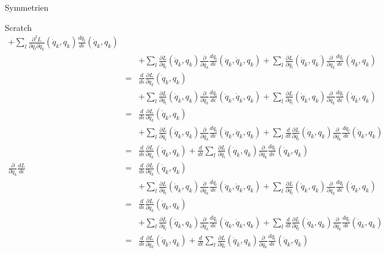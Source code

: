 \documentclass[a4paper,fleqn]{article}
\numberwithin{equation}{section}
\begin{document}
\begin{section}{Symmetrien}
\begin{subsection}{Scratch}
\begin{eqnarray*}
+\sum_l\frac{\partial^2 L}{\partial q_l\partial q_k}(\dot{q}_k,q_k)\frac{dq_l}{d\epsilon}(\dot{q}_k,q_k)\\
&&+\sum_l\frac{\partial L}{\partial \dot{q}_l}(\dot{q}_k,q_k)\frac{\partial}{\partial q_k}\frac{d\dot{q}_l}{d\epsilon}(\ddot{q}_k,\dot{q}_k,q_k)
+\sum_l\frac{\partial L}{\partial q_l}(\dot{q}_k,q_k)\frac{\partial}{\partial q_k}\frac{dq_l}{d\epsilon}(\dot{q}_k,q_k)\\
&=&\frac{d}{d\epsilon}\frac{\partial L}{\partial q_k}(\dot{q}_k,q_k)\\
&&+\sum_l\frac{\partial L}{\partial \dot{q}_l}(\dot{q}_k,q_k)\frac{\partial}{\partial q_k}\frac{d\dot{q}_l}{d\epsilon}(\ddot{q}_k,\dot{q}_k,q_k)
+\sum_l\frac{\partial L}{\partial q_l}(\dot{q}_k,q_k)\frac{\partial}{\partial q_k}\frac{dq_l}{d\epsilon}(\dot{q}_k,q_k)\\
&=&\frac{d}{d\epsilon}\frac{\partial L}{\partial q_k}(\dot{q}_k,q_k)\\
&&+\sum_l\frac{\partial L}{\partial \dot{q}_l}(\dot{q}_k,q_k)\frac{\partial}{\partial q_k}\frac{d\dot{q}_l}{d\epsilon}(\ddot{q}_k,\dot{q}_k,q_k)
+\sum_l\frac{d}{dt}\frac{\partial L}{\partial \dot{q}_l}(\dot{q}_k,q_k)\frac{\partial}{\partial q_k}\frac{dq_l}{d\epsilon}(\dot{q}_k,q_k)\\
&=&\frac{d}{d\epsilon}\frac{\partial L}{\partial q_k}(\dot{q}_k,q_k)+\frac{d}{dt}\sum_l\frac{\partial L}{\partial \dot{q}_l}(\dot{q}_k,q_k)\frac{\partial}{\partial q_k}\frac{dq_l}{d\epsilon}(\dot{q}_k,q_k)\\
\frac{\partial}{\partial \dot{q}_k}\frac{dL}{d\epsilon}&=&\frac{d}{d\epsilon}\frac{\partial L}{\partial \dot{q}_k}(\dot{q}_k,q_k)\\
&&+\sum_l\frac{\partial L}{\partial \dot{q}_l}(\dot{q}_k,q_k)\frac{\partial}{\partial \dot{q}_k}\frac{d\dot{q}_l}{d\epsilon}(\ddot{q}_k,\dot{q}_k,q_k)
+\sum_l\frac{\partial L}{\partial q_l}(\dot{q}_k,q_k)\frac{\partial}{\partial \dot{q}_k}\frac{dq_l}{d\epsilon}(\dot{q}_k,q_k)\\
&=&\frac{d}{d\epsilon}\frac{\partial L}{\partial \dot{q}_k}(\dot{q}_k,q_k)\\
&&+\sum_l\frac{\partial L}{\partial \dot{q}_l}(\dot{q}_k,q_k)\frac{\partial}{\partial \dot{q}_k}\frac{d\dot{q}_l}{d\epsilon}(\ddot{q}_k,\dot{q}_k,q_k)
+\sum_l\frac{d}{dt}\frac{\partial L}{\partial \dot{q}_l}(\dot{q}_k,q_k)\frac{\partial}{\partial \dot{q}_k}\frac{dq_l}{d\epsilon}(\dot{q}_k,q_k)\\
&=&\frac{d}{d\epsilon}\frac{\partial L}{\partial \dot{q}_k}(\dot{q}_k,q_k)
+\frac{d}{dt}\sum_l\frac{\partial L}{\partial \dot{q}_l}(\dot{q}_k,q_k)\frac{\partial}{\partial \dot{q}_k}\frac{dq_l}{d\epsilon}(\dot{q}_k,q_k)\\

\end{eqnarray*}
\end{subsection}
\end{section}
\end{document}

